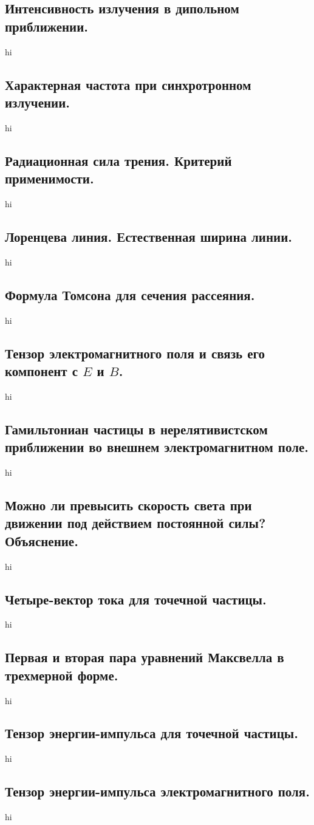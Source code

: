 \documentclass[a4paper,12pt]{article}
\begin{document}
\subsection{Интенсивность излучения в дипольном приближении.}
hi
\subsection{Характерная частота при синхротронном излучении.}
hi
\subsection{Радиационная сила трения. Критерий применимости.}
hi
\subsection{Лоренцева линия. Естественная ширина линии.}
hi
\subsection{Формула Томсона для сечения рассеяния.}
hi
\subsection{Тензор электромагнитного поля и связь его компонент с $E$ и $B$.}
hi
\subsection{Гамильтониан частицы в нерелятивистском приближении во внешнем
электромагнитном поле.}
hi
\subsection{Можно ли превысить скорость света при движении под действием
постоянной силы? Объяснение.}
hi
\subsection{Четыре-вектор тока для точечной частицы.}
hi
\subsection{Первая и вторая пара уравнений Максвелла в трехмерной форме.}
hi
\subsection{Тензор энергии-импульса для точечной частицы.}
hi
\subsection{Тензор энергии-импульса электромагнитного поля.}
hi
\end{document}
